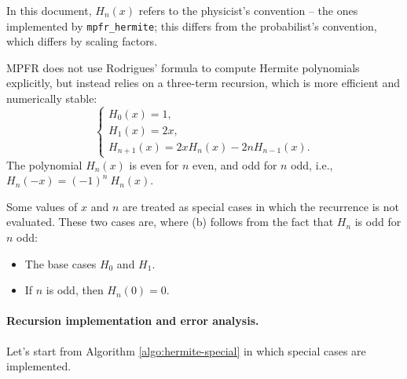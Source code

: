 \documentclass[12pt]{amsart}
\begin{document}
In this document, $H_n(x)$ refers to the physicist's convention -- the
ones implemented by \texttt{mpfr\_hermite}; this differs from the
probabilist's convention, which differs by scaling factors.

MPFR does not use Rodrigues' formula to compute Hermite polynomials
explicitly, but instead relies on a three-term recursion, which is more
efficient and numerically stable:
\begin{equation} \label{eq:hermite-recursion}
  \begin{cases}
      H_0(x) = 1,  \\
      H_1(x) = 2x, \\
      H_{n+1}(x) = 2xH_{n}(x) - 2nH_{n-1}(x).
  \end{cases}
\end{equation}
The polynomial $H_n(x)$ is even for $n$ even, and odd for $n$ odd,
i.e., $H_n(-x) = (-1)^n~H_n(x)$.

Some values of $x$ and $n$ are treated as special cases in which the
recurrence is not evaluated. These two cases are, where (b) follows
from the fact that $H_n$ is odd for $n$ odd:
\begin{itemize}
\item[(a)] The base cases $H_0$ and $H_1$.
\item[(b)] If $n$ is odd, then $H_n(0) = 0$.
\end{itemize}

\paragraph{\textbf{Recursion implementation and error analysis.}}

Let's start from Algorithm \ref{algo:hermite-special} in which special cases
are implemented.
\vspace{.3cm}

\begin{algorithm}[H]
  \caption{\texttt{mpfr\_hermite} special cases}
  \label{algo:hermite-special}
  \BlankLine
  \BlankLine
\end{algorithm}
\vspace{.3cm}
\end{document}
